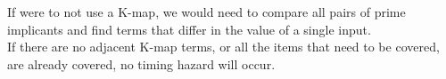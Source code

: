 \documentclass[nobib]{tufte-handout}
\begin{document}
\begin{center}
\end{center}
If were to not use a K-map, we would need to compare all pairs of prime implicants and find terms that differ in the value of a single input.\\
If there are no adjacent K-map terms, or all the items that need to be covered, are already covered, no timing hazard will occur.
\end{document}
